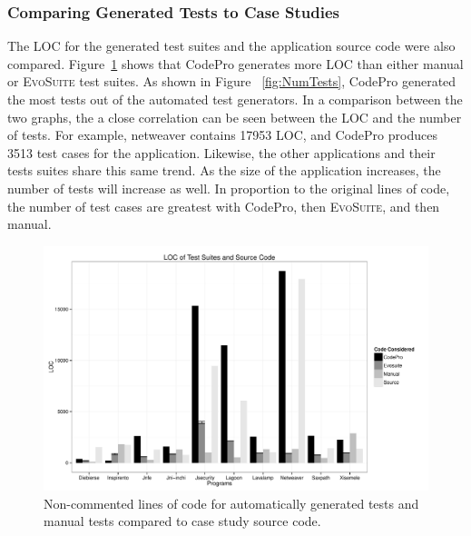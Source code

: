 \subsubsection{Comparing Generated Tests to Case Studies}



The LOC for the generated test suites and the application source code were also compared. Figure~\ref{fig:LOC} shows that CodePro generates more LOC than either manual or \textsc{EvoSuite} test suites. As shown in Figure ~\ref{fig:NumTests}, CodePro generated the most tests out of the automated test generators. In a comparison between the two graphs, the a close correlation can be seen between the LOC and the number of tests. For example, netweaver contains 17953 LOC, and CodePro produces 3513 test cases for the application. Likewise, the other applications and their tests suites share this same trend. As the size of the application increases, the number of tests will increase as well. In proportion to the original lines of code, the number of test cases are greatest with CodePro, then \textsc{EvoSuite}, and then manual. 
 
\begin{figure}[!t]
\centering
  \includegraphics[width=\linewidth]{RGraphs/LOC.pdf}
    \caption{Non-commented lines of code for automatically generated tests and manual tests compared to case study source code. }
  \label{fig:LOC}
\end{figure}

